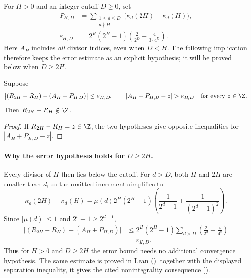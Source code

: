 For $H>0$ and an integer cutoff $D\ge0$, set
\[
\begin{aligned}
 P_{H,D}&=\sum_{\substack{1\le d\le D\\d\nmid H}}
                    \bigl(\kappa_d(2H)-\kappa_d(H)\bigr),\\
 \varepsilon_{H,D}
   &=2^H(2^H-1)\left(\frac2{2^D}+\frac4{3\cdot4^D}\right).
\end{aligned}
\]
Here $A_H$ includes \emph{all} divisor indices, even when $D<H$.
The following implication therefore keeps the error estimate as an
explicit hypothesis; it will be proved below when $D\ge2H$.

\begin{prop}\label{prop:separation-larger-than-error-implies}
Suppose
\[
 \bigl|(R_{2H}-R_H)-(A_H+P_{H,D})\bigr|\le\varepsilon_{H,D},
 \qquad
 |A_H+P_{H,D}-z|>\varepsilon_{H,D}\quad\hbox{for every }z\in\Z.
\]
Then $R_{2H}-R_H\notin\Z$.
\end{prop}
\begin{proof}
If $R_{2H}-R_H=z\in\Z$, the two hypotheses give opposite inequalities
for $|A_H+P_{H,D}-z|$.
\end{proof}

\paragraph{Why the error hypothesis holds for $D\ge2H$.}
Every divisor of $H$ then lies below the cutoff. For $d>D$, both
$H$ and $2H$ are smaller than $d$, so the omitted increment simplifies to
\[
 \kappa_d(2H)-\kappa_d(H)
 =\mu(d)2^H(2^H-1)
       \left(\frac1{2^d-1}+\frac1{(2^d-1)^2}\right).
\]
Since $|\mu(d)|\le1$ and $2^d-1\ge2^{d-1}$,
\[
\begin{aligned}
 \bigl|(R_{2H}-R_H)-(A_H+P_{H,D})\bigr|
 &\le 2^H(2^H-1)\sum_{d>D}\left(\frac2{2^d}+\frac4{4^d}\right)\\
 &=\varepsilon_{H,D}.
\end{aligned}
\]
Thus for $H>0$ and $D\ge2H$ the error bound needs no additional
convergence hypothesis. The same estimate is proved in Lean
();
together with the displayed separation inequality, it gives the cited
nonintegrality consequence
().

